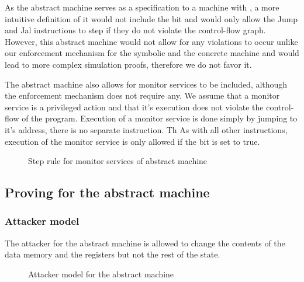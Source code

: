 As the abstract machine serves as a specification to a machine with \CFI, a more
intuitive definition of it would not include the \ok bit and would only allow
the Jump and Jal instructions to step if they do not violate the control-flow
graph. However, this abstract machine would not allow for any violations to
occur unlike our enforcement mechanism for the symbolic and the concrete machine
and would lead to more complex simulation proofs, therefore we do not favor it.

The abstract machine also allows for monitor services to be included, although
the \CFI enforcement mechanism does not require any. We assume that a monitor
service is a privileged action and that it's execution does not violate the
control-flow of the program. Execution of a monitor service is done simply by
jumping to it's address, there is no separate instruction. Th
As with all other instructions, execution of the monitor service is only allowed
if the \ok bit is set to true.

\begin{figure}[!htpb]
\caption{Step rule for monitor services of abstract machine}
\end{figure}

\subsection{Proving \CFI for the abstract machine}\label{abstract_proof}

\subsubsection{Attacker model}\label{sec:abstract_attacker}

The attacker for the abstract machine is allowed to change the
contents of the data memory and the registers but not the rest of the state.

\begin{figure}[!htpb]
\caption{Attacker model for the abstract machine}
\end{figure}


